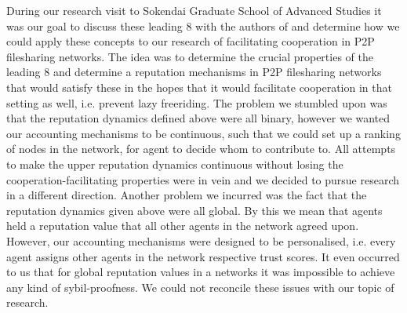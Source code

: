 \noindent{}During our research visit to Sokendai Graduate School of Advanced Studies it was our goal to discuss these leading 8 with the authors of \cite{The leading eight: Social norms that can maintain cooperation by indirect reciprocity} and determine how we could apply these  concepts to our research of facilitating cooperation in P2P filesharing networks. The idea was to determine the crucial properties of the leading 8 and determine a reputation mechanisms in P2P filesharing networks that would satisfy these in the hopes that it would facilitate cooperation in that setting as well, i.e. prevent lazy freeriding. The problem we stumbled upon was that the reputation dynamics defined above were all binary, however we wanted our accounting mechanisms to be continuous, such that we could set up a ranking of nodes in the network, for agent to decide whom to contribute to. All attempts to make the upper reputation dynamics continuous without losing the cooperation-facilitating properties were in vein and we decided to pursue research in a different direction. Another problem we incurred was the fact that the reputation dynamics given above were all global. By this we mean that agents held a reputation value that all other agents in the network agreed upon. However, our accounting mechanisms were designed to be personalised, i.e. every agent assigns other agents in the network respective trust scores. It even occurred to us that for global reputation values in a networks it was impossible to achieve any kind of sybil-proofness. We could not reconcile these issues with our topic of research. \vspace{1em}\\





